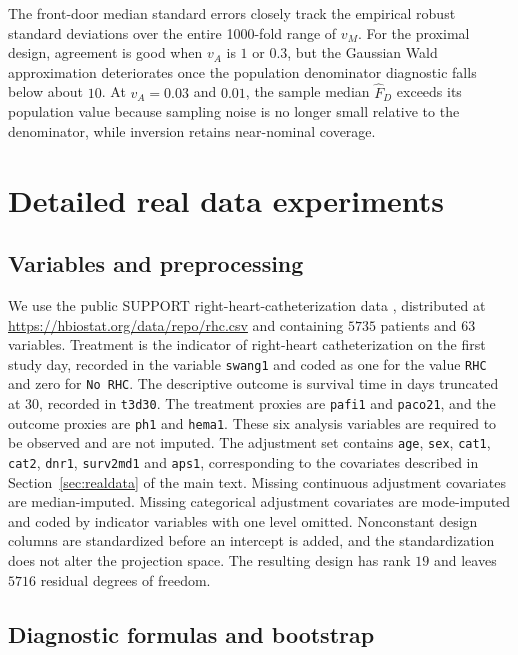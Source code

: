\documentclass[12pt,a4paper]{article}
\theoremstyle{plain}
\theoremstyle{definition}
\newcommand{\FD}{\widehat{F}_D}
\begin{document}
The front-door median standard errors closely track the empirical robust standard deviations over the entire 1000-fold range of $v_M$.
For the proximal design, agreement is good when $v_A$ is $1$ or $0.3$, but the Gaussian Wald approximation deteriorates once the population denominator diagnostic falls below about $10$.
At $v_A=0.03$ and $0.01$, the sample median $\FD$ exceeds its population value because sampling noise is no longer small relative to the denominator, while inversion retains near-nominal coverage.

\section{Detailed real data experiments}
\label{supp:realdata}

\subsection{Variables and preprocessing}
\label{supp:support-preprocessing}

We use the public SUPPORT right-heart-catheterization data \citep{connors1996}, distributed at \url{https://hbiostat.org/data/repo/rhc.csv} and containing $5735$ patients and $63$ variables.
Treatment is the indicator of right-heart catheterization on the first study day, recorded in the variable \texttt{swang1} and coded as one for the value \texttt{RHC} and zero for \texttt{No RHC}.
The descriptive outcome is survival time in days truncated at $30$, recorded in \texttt{t3d30}.
The treatment proxies are \texttt{pafi1} and \texttt{paco21}, and the outcome proxies are \texttt{ph1} and \texttt{hema1}.
These six analysis variables are required to be observed and are not imputed.
The adjustment set contains \texttt{age}, \texttt{sex}, \texttt{cat1}, \texttt{cat2}, \texttt{dnr1}, \texttt{surv2md1} and \texttt{aps1}, corresponding to the covariates described in Section~\ref{sec:realdata} of the main text.
Missing continuous adjustment covariates are median-imputed.
Missing categorical adjustment covariates are mode-imputed and coded by indicator variables with one level omitted.
Nonconstant design columns are standardized before an intercept is added, and the standardization does not alter the projection space.
The resulting design has rank $19$ and leaves $5716$ residual degrees of freedom.

\subsection{Diagnostic formulas and bootstrap}
\label{supp:support-diagnostics}
\end{document}
